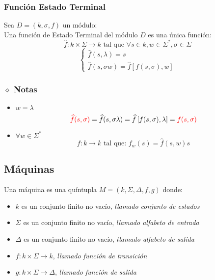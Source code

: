 \subsubsection{Función Estado Terminal}
Sea $D=(k,\sigma,f)$ un módulo: \\${ }$\\
Una función de Estado Terminal del módulo $D$ es una única función:
$$
\widehat{f}:k\times\Sigma \rightarrow k \text{ tal que } \forall s\in k, w\in\Sigma^* , \sigma\in\Sigma
$$
$$
\begin{cases}
\widehat{f}(s,\lambda)=s \\
\widehat{f}(s,\sigma w)= \widehat{f}\left[ f(s,\sigma),w\right]
\end{cases}
$$
\subsubsection{$\diamond$ Notas}
\begin{itemize}
\item $w=\lambda$
$$
{\color{red}\widehat{f}(s,\sigma)}=\widehat{f}(s,\sigma\lambda)=\widehat{f}\left[ f(s,\sigma),\lambda\right]={\color{red}f(s,\sigma)}
$$
\item $\forall w\in\Sigma^*$
$$
f:k \rightarrow k \text{ tal que: } f_w(s)=\widehat{f}(s,w)
s
$$
\end{itemize}

\subsection{Máquinas}
Una máquina es una quíntupla $M=(k,\Sigma,\Delta,f,g)$ donde:
\begin{itemize}
\item $k$ es un conjunto finito no vacío, \textit{llamado conjunto de estados}
\item $\Sigma$ es un conjunto finito no vacío, \textit{llamado alfabeto de entrada}
\item $\Delta$ es un conjunto finito no vacío, \textit{llamado alfabeto de salida}
\item $f:k\times\Sigma\rightarrow k$, \textit{llamado función de transición}
\item $g:k\times\Sigma\rightarrow \Delta$, \textit{llamado función de salida}
\end{itemize}
